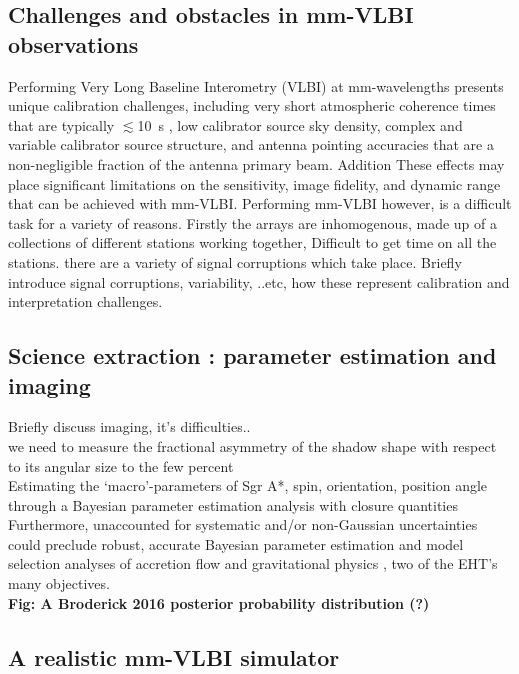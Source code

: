 \subsection{Challenges and obstacles in mm-VLBI observations}
Performing Very Long Baseline Interometry (VLBI) at mm-wavelengths presents unique calibration challenges, including very short atmospheric coherence times that are typically $\lesssim$10~s \citep{Doeleman_2009}, low calibrator source sky density, complex and variable calibrator source structure, and antenna pointing accuracies that are a non-negligible fraction of the antenna primary beam. Addition These effects may place significant limitations on the sensitivity, image fidelity, and dynamic range that can be achieved with mm-VLBI.  Performing mm-VLBI however, is a difficult task for a variety of reasons. Firstly the arrays are inhomogenous, made up of a collections of different stations working together, Difficult to get time on all the stations. there are a variety of signal corruptions which take place. Briefly introduce signal corruptions, variability, ..etc, how these represent calibration and interpretation challenges.


\subsection{Science extraction : parameter estimation and imaging}

Briefly discuss imaging, it's difficulties..\\we need to measure the fractional
asymmetry of the shadow shape with respect to its angular size to the few percent
~\\
Estimating the `macro'-parameters of Sgr A*, spin, orientation, position angle through a Bayesian parameter estimation analysis with closure quantities\\
Furthermore, unaccounted for systematic and/or non-Gaussian uncertainties could preclude robust, accurate Bayesian parameter estimation and model selection analyses of accretion flow \citep[e.g.][]{Broderick_2016} and gravitational physics \citep[e.g.][]{Broderick_2014, Psaltis_2016}, two of the EHT's many objectives.
~\\
\textbf{Fig: A Broderick 2016 posterior probability distribution (?)}

\subsection{A realistic mm-VLBI simulator}


